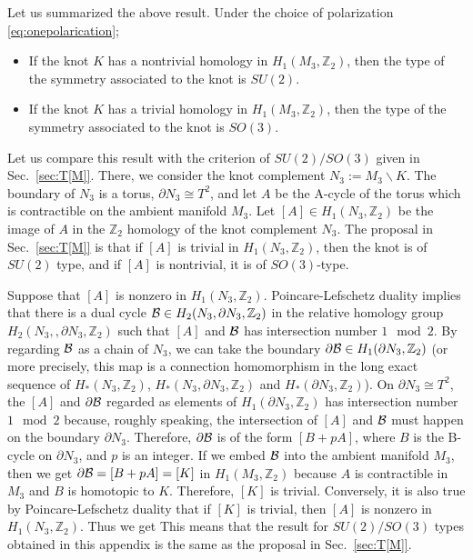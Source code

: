 \documentclass[a4paper,11pt]{article}
\def\CB{{\cal B}}
\def\BZ{{\mathbb Z}}
\def\beq#1\eeq{\begin{align}#1\end{align}}
\begin{document}
Let us summarized the above result. Under the choice of polarization \eqref{eq:onepolarication};
\begin{itemize}
\item If the knot $K$ has a nontrivial homology in $H_1(M_3, \BZ_2)$, then the type of the symmetry associated to the knot is $SU(2)$.
\item If the knot $K$ has a trivial homology in $H_1(M_3, \BZ_2)$, then the type of the symmetry associated to the knot is $SO(3)$.
\end{itemize}
Let us compare this result with the criterion of $SU(2)/SO(3)$ given in Sec.~\ref{sec:T[M]}.
There, we consider the knot complement $N_3:=M_3 \backslash K$. The boundary of $N_3$ is
a torus, $\partial N_3 \cong T^2$, and let $A$ be the A-cycle of the torus which is contractible on the ambient manifold $M_3$.
Let $[A] \in H_1(N_3, \BZ_2)$ be the image of $A$ in the $\BZ_2$ homology of the knot complement $N_3$.
The proposal in Sec.~\ref{sec:T[M]} is that if $[A]$ is trivial in $H_1(N_3, \BZ_2)$, 
then the knot is of $SU(2)$ type, and if $[A]$ is nontrivial, it is of $SO(3)$-type.

Suppose that $[A]$ is nonzero in $H_1(N_3, \BZ_2)$. Poincare-Lefschetz duality implies that
there is a dual cycle $\CB \in H_2(N_3,  \partial N_3, \BZ_2)$ in the relative homology group  $H_2(N_3, , \partial N_3, \BZ_2)$ such
that $[A]$ and $\CB$ has intersection number $1 \mod 2$. By regarding $\CB$ as a chain of $N_3$,
we can take 
the boundary $\partial \CB \in H_1(\partial N_3, \BZ_2)$ (or more precisely, this map is a connection homomorphism in the long exact sequence
of $H_*(N_3, \BZ_2)$, $H_*(N_3,\partial N_3, \BZ_2)$ and $H_*(\partial N_3, \BZ_2)$).
On $\partial N_3 \cong T^2$, the $[A]$ and $\partial \CB$ regarded as elements of $H_1(\partial N_3, \BZ_2)$ 
has intersection number $1 \mod 2$ because, roughly speaking, the intersection of $[A]$ and $\CB$ must happen on the boundary $\partial N_3$. 
Therefore, $\partial \CB$ is of the form $[B+p A]$, where $B$ is the B-cycle on $\partial N_3$,
and $p $ is an integer. If we embed $\CB$ into the ambient manifold $M_3$,
then we get $\partial \CB = [B+pA]=[K]$ in $H_1(M_3, \BZ_2)$ because $A$ is contractible in $M_3$ and $B$ is homotopic to $K$. 
Therefore, $[K]$ is trivial. Conversely, it is also true by Poincare-Lefschetz duality that if $[K]$ is trivial, then $[A]$ is nonzero in $H_1( N_3, \BZ_2)$.
Thus we get
\beq
\text{$[A] \in H_1(N_3, \BZ_2)$ is nonzero} \Longleftrightarrow  \text{$[K] \in H_1(M_3, \BZ_2)$ is zero.} 
\eeq
This means that the result for $SU(2)/SO(3)$ types obtained in this appendix is the same as the proposal in Sec.~\ref{sec:T[M]}.
\end{document}
